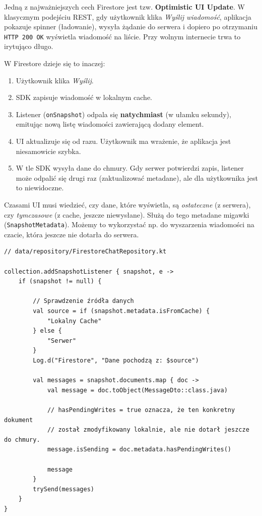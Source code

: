 Jedną z najważniejszych cech Firestore jest tzw. \textbf{Optimistic UI Update}. W klasycznym podejściu REST, gdy użytkownik klika \textit{Wyślij wiadomość}, aplikacja pokazuje spinner (ładowanie), wysyła żądanie do serwera i dopiero po otrzymaniu \texttt{HTTP 200 OK} wyświetla wiadomość na liście. Przy wolnym internecie trwa to irytująco długo.

W Firestore dzieje się to inaczej:
\begin{enumerate}
    \item Użytkownik klika \textit{Wyślij}.
    \item SDK zapisuje wiadomość w lokalnym cache.
    \item Listener (\texttt{onSnapshot}) odpala się \textbf{natychmiast} (w ułamku sekundy), emitując nową listę wiadomości zawierającą dodany element.
    \item UI aktualizuje się od razu. Użytkownik ma wrażenie, że aplikacja jest niesamowicie szybka.
    \item W tle SDK wysyła dane do chmury. Gdy serwer potwierdzi zapis, listener może odpalić się drugi raz (zaktualizować metadane), ale dla użytkownika jest to niewidoczne.
\end{enumerate}

Czasami UI musi wiedzieć, czy dane, które wyświetla, są \textit{ostateczne} (z serwera), czy \textit{tymczasowe} (z cache, jeszcze niewysłane). Służą do tego metadane migawki (\texttt{SnapshotMetadata}). Możemy to wykorzystać np. do wyszarzenia wiadomości na czacie, która jeszcze nie dotarła do serwera.

\begin{verbatim}
// data/repository/FirestoreChatRepository.kt

collection.addSnapshotListener { snapshot, e ->
    if (snapshot != null) {
        
        // Sprawdzenie źródła danych
        val source = if (snapshot.metadata.isFromCache) {
            "Lokalny Cache"
        } else {
            "Serwer"
        }
        Log.d("Firestore", "Dane pochodzą z: $source")

        val messages = snapshot.documents.map { doc ->
            val message = doc.toObject(MessageDto::class.java)
            
            // hasPendingWrites = true oznacza, że ten konkretny dokument
            // został zmodyfikowany lokalnie, ale nie dotarł jeszcze do chmury.
            message.isSending = doc.metadata.hasPendingWrites()
            
            message
        }
        trySend(messages)
    }
}
\end{verbatim}

